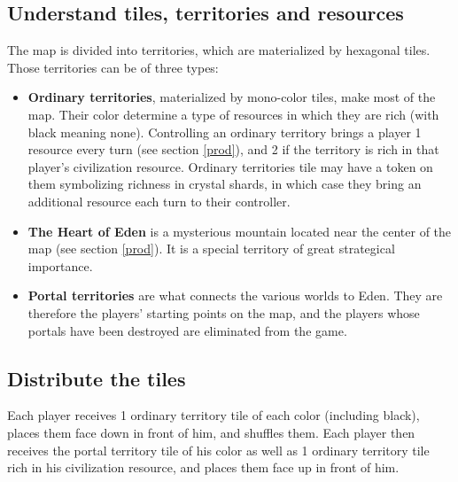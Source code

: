 \documentclass[a4paper]{article}
\begin{document}
    \subsection{Understand tiles, territories and resources}
        The map is divided into territories, which are materialized by hexagonal tiles.
        Those territories can be of three types:
         \vspace{-1.3em}
        \begin{itemize}
            \item \textbf{Ordinary territories}, materialized by mono-color tiles,
                make most of the map.
                Their color determine a type of resources in which they are rich
                (with black meaning none).
                Controlling an ordinary territory brings a player 1 resource every turn
                (see section \ref{prod}), and 2 if the territory is rich
                in that player's civilization resource.
                Ordinary territories tile may have a token on them symbolizing richness
                in crystal shards, in which case they bring an additional resource
                each turn to their controller.
            
            \item \textbf{The Heart of Eden} is a mysterious mountain located near
                the center of the map (see section \ref{prod}).
                It is a special territory of great strategical importance.
            
            \item \textbf{Portal territories} are what connects the various worlds
                to Eden.
                They are therefore the players' starting points on the map,
                and the players whose portals have been destroyed are eliminated from
                the game.
        \end{itemize}   

    \subsection{Distribute the tiles}
        Each player receives 1 ordinary territory tile of each color (including black),
        places them face down in front of him, and shuffles them.
        Each player then receives the portal territory tile of his color
        as well as 1 ordinary territory tile rich in his civilization resource,
        and places them face up in front of him.
        
\end{document}
